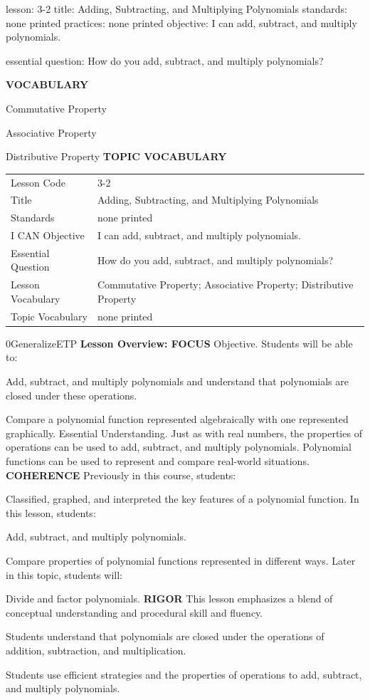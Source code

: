 \documentclass{article}
\newenvironment{lesson-meta}{}{}        %
\newenvironment{te-addendum}[2]{}{}     %
\newcommand{\te}[1]{}                   %
\begin{document}
\begin{lesson-meta}
lesson: 3-2
title: Adding, Subtracting, and Multiplying Polynomials
standards: none printed
practices: none printed
objective: I can add, subtract, and multiply polynomials.

essential question: How do you add, subtract, and multiply polynomials?

\textbf{VOCABULARY}
\item Commutative Property
\item Associative Property
\item Distributive Property
\textbf{TOPIC VOCABULARY}
\te{No separate topic vocabulary list is printed on these lesson pages.}
\begin{tabular}{ll}
Lesson Code & 3-2 \\
Title & Adding, Subtracting, and Multiplying Polynomials \\
Standards & none printed \\
I CAN Objective & I can add, subtract, and multiply polynomials. \\
Essential Question & How do you add, subtract, and multiply polynomials? \\
Lesson Vocabulary & Commutative Property; Associative Property; Distributive Property \\
Topic Vocabulary & none printed \\
\end{tabular}
\end{lesson-meta}
\begin{te-addendum}{0}{GeneralizeETP}
\textbf{Lesson Overview: FOCUS}
Objective. Students will be able to:
\item Add, subtract, and multiply polynomials and understand that polynomials are closed under these operations.
\item Compare a polynomial function represented algebraically with one represented graphically.
Essential Understanding. Just as with real numbers, the properties of operations can be used to add, subtract, and multiply polynomials. Polynomial functions can be used to represent and compare real-world situations.
\textbf{COHERENCE}
Previously in this course, students:
\item Classified, graphed, and interpreted the key features of a polynomial function.
In this lesson, students:
\item Add, subtract, and multiply polynomials.
\item Compare properties of polynomial functions represented in different ways.
Later in this topic, students will:
\item Divide and factor polynomials.
\textbf{RIGOR}
This lesson emphasizes a blend of conceptual understanding and procedural skill and fluency.
\item Students understand that polynomials are closed under the operations of addition, subtraction, and multiplication.
\item Students use efficient strategies and the properties of operations to add, subtract, and multiply polynomials.
\te{Program Resources. SavvasRealize.com.}
\end{te-addendum}
\end{document}
